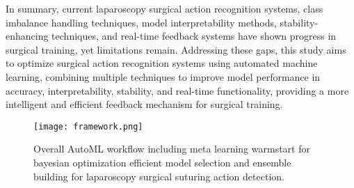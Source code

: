 In summary, current laparoscopy surgical action recognition systems, class imbalance handling techniques, model interpretability methods, stability-enhancing techniques, and real-time feedback systems have shown progress in surgical training, yet limitations remain. Addressing these gaps, this study aims to optimize surgical action recognition systems using automated machine learning, combining multiple techniques to improve model performance in accuracy, interpretability, stability, and real-time functionality, providing a more intelligent and efficient feedback mechanism for surgical training.


\begin{figure*}[h!]
	\centering
	\texttt{[image: framework.png]}
	\caption{Overall AutoML workflow including meta learning warmstart for bayesian optimization efficient model selection and ensemble building for laparoscopy surgical suturing action detection. 
	}
	\label{framework}
\end{figure*}